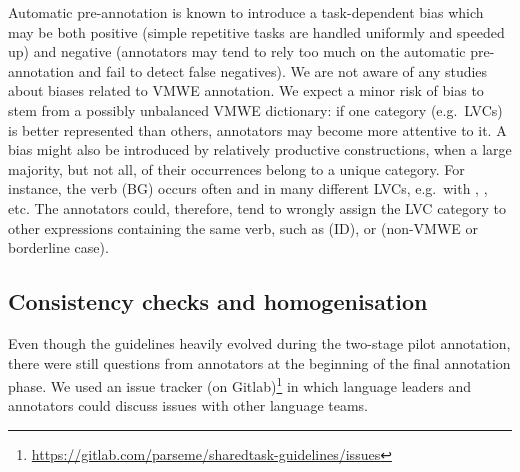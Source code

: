 \documentclass[output=paper,modfonts]{langscibook}
\begin{document}
Automatic pre-annotation is known to introduce a task-dependent bias \citep{Marcus:1993:BLA:972470.972475,Fort:2010:IPP:1868720.1868727} which may be both positive (simple repetitive tasks are handled uniformly and speeded up) and negative (annotators may tend to rely too much on the automatic pre-annotation and fail to detect false negatives). We are not aware of any studies about biases related to VMWE annotation. We expect a minor risk of bias to stem from a possibly unbalanced VMWE dictionary: if one category (e.g.\ LVCs) is better represented than others, annotators may become more attentive to it. A bias might also be introduced by relatively productive constructions, when a large majority, but not all, of their occurrences belong to a unique category. For instance, the verb (BG)
 occurs often and in many different LVCs, e.g.\ with %
, %
, etc. The annotators could, therefore, tend to wrongly assign the LVC category to other expressions containing the same verb, such as  
 (ID), or %
 (non-VMWE or borderline case). 

\subsection{Consistency checks and homogenisation}
\label{sec:consistency}
%

Even though the guidelines heavily evolved during the two-stage pilot annotation, there were still questions from annotators at the beginning of the final annotation phase. We used an issue tracker (on Gitlab)\footnote{\url{https://gitlab.com/parseme/sharedtask-guidelines/issues}} in which language leaders and annotators could discuss issues with other language teams.

 
\end{document}
